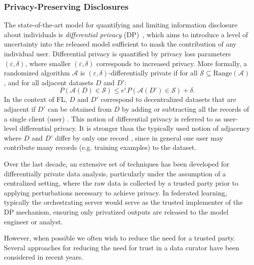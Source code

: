 \subsubsection{Privacy-Preserving Disclosures}
\label{sssec:private_disclosures}

The state-of-the-art model for quantifying and limiting information disclosure about individuals is \textit{differential privacy} (DP)~\cite{DMNS06, dwork2008differential, dwork2014algorithmic}, which aims to introduce a level of uncertainty into the released model sufficient to mask the contribution of any individual user. Differential privacy is quantified by privacy loss parameters $(\varepsilon, \delta)$, where smaller $(\varepsilon, \delta)$ corresponds to increased privacy. More formally,  a randomized algorithm $\mathcal{A}$ is $(\varepsilon, \delta)$-differentially private if for all $\mathcal{S} \subseteq \text{Range}(\mathcal{A})$, and for all adjacent datasets $D$ and $D'$:
\begin{equation}
\label{eq-dp}
P(\mathcal{A}(D) \in \mathcal{S}) \le e^\varepsilon P(\mathcal{A}(D') \in \mathcal{S}) + \delta.
\end{equation}
In the context of FL, $D$ and $D'$ correspond to decentralized datasets that are adjacent if $D'$ can be obtained from $D$ by adding or subtracting all the records of a single client (user) \citep{mcmahan18dplm}. This notion of differential privacy is referred to as user-level differential privacy. It is stronger than the typically used notion of adjacency where $D$ and $D'$ differ by only one record \citep{dwork2014algorithmic}, since in general one user may contribute many records (e.g. training examples) to the dataset.


Over the last decade, an extensive set of techniques has been developed for differentially private data analysis, particularly under the assumption of a centralized setting, where the raw data is collected by a trusted party prior to applying perturbations necessary to achieve privacy. In federated learning, typically the orchestrating server would serve as the trusted implementer of the DP mechanism, ensuring only privatized outputs are released to the model engineer or analyst.

However, when possible we often wish to reduce the need for a trusted party. Several approaches for reducing the need for trust in a data curator have been considered in recent years.

